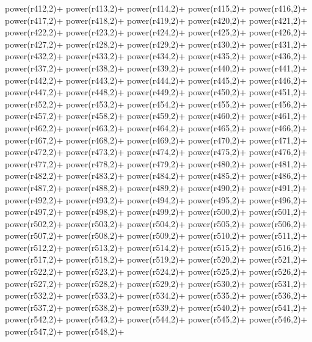 \begin{DoxyCode}
{    power(r412,2)+
    power(r413,2)+
    power(r414,2)+
    power(r415,2)+
    power(r416,2)+
    power(r417,2)+
    power(r418,2)+
    power(r419,2)+
    power(r420,2)+
    power(r421,2)+
    power(r422,2)+
    power(r423,2)+
    power(r424,2)+
    power(r425,2)+
    power(r426,2)+
    power(r427,2)+
    power(r428,2)+
    power(r429,2)+
    power(r430,2)+
    power(r431,2)+
    power(r432,2)+
    power(r433,2)+
    power(r434,2)+
    power(r435,2)+
    power(r436,2)+
    power(r437,2)+
    power(r438,2)+
    power(r439,2)+
    power(r440,2)+
    power(r441,2)+
    power(r442,2)+
    power(r443,2)+
    power(r444,2)+
    power(r445,2)+
    power(r446,2)+
    power(r447,2)+
    power(r448,2)+
    power(r449,2)+
    power(r450,2)+
    power(r451,2)+
    power(r452,2)+
    power(r453,2)+
    power(r454,2)+
    power(r455,2)+
    power(r456,2)+
    power(r457,2)+
    power(r458,2)+
    power(r459,2)+
    power(r460,2)+
    power(r461,2)+
    power(r462,2)+
    power(r463,2)+
    power(r464,2)+
    power(r465,2)+
    power(r466,2)+
    power(r467,2)+
    power(r468,2)+
    power(r469,2)+
    power(r470,2)+
    power(r471,2)+
    power(r472,2)+
    power(r473,2)+
    power(r474,2)+
    power(r475,2)+
    power(r476,2)+
    power(r477,2)+
    power(r478,2)+
    power(r479,2)+
    power(r480,2)+
    power(r481,2)+
    power(r482,2)+
    power(r483,2)+
    power(r484,2)+
    power(r485,2)+
    power(r486,2)+
    power(r487,2)+
    power(r488,2)+
    power(r489,2)+
    power(r490,2)+
    power(r491,2)+
    power(r492,2)+
    power(r493,2)+
    power(r494,2)+
    power(r495,2)+
    power(r496,2)+
    power(r497,2)+
    power(r498,2)+
    power(r499,2)+
    power(r500,2)+
    power(r501,2)+
    power(r502,2)+
    power(r503,2)+
    power(r504,2)+
    power(r505,2)+
    power(r506,2)+
    power(r507,2)+
    power(r508,2)+
    power(r509,2)+
    power(r510,2)+
    power(r511,2)+
    power(r512,2)+
    power(r513,2)+
    power(r514,2)+
    power(r515,2)+
    power(r516,2)+
    power(r517,2)+
    power(r518,2)+
    power(r519,2)+
    power(r520,2)+
    power(r521,2)+
    power(r522,2)+
    power(r523,2)+
    power(r524,2)+
    power(r525,2)+
    power(r526,2)+
    power(r527,2)+
    power(r528,2)+
    power(r529,2)+
    power(r530,2)+
    power(r531,2)+
    power(r532,2)+
    power(r533,2)+
    power(r534,2)+
    power(r535,2)+
    power(r536,2)+
    power(r537,2)+
    power(r538,2)+
    power(r539,2)+
    power(r540,2)+
    power(r541,2)+
    power(r542,2)+
    power(r543,2)+
    power(r544,2)+
    power(r545,2)+
    power(r546,2)+
    power(r547,2)+
    power(r548,2)+
}
\end{DoxyCode}
